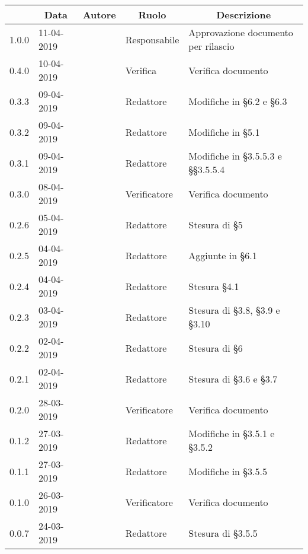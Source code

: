 \pagestyle{styleDocPages}

\begin{center} \sloppy
	\renewcommand{\arraystretch}{2.5}
	
	\begin{longtable}[H]{p{1.7cm} p{2cm} p{1.8cm} p{2.5cm} p{4cm}}
\rowcolor[HTML]{232f3e}
\multicolumn{1}{c}{\color[HTML]{FFFFFF} \textbf{Versione}} & 
\multicolumn{1}{c}{\color[HTML]{FFFFFF} \textbf{Data}} & 
\multicolumn{1}{c}{\color[HTML]{FFFFFF} \textbf{Autore}} & 
\multicolumn{1}{c}{\color[HTML]{FFFFFF} \textbf{Ruolo}} & 
\multicolumn{1}{c}{\color[HTML]{FFFFFF} \textbf{Descrizione}} \\
\endhead

1.0.0 & 11-04-2019 & \daniele{} & Responsabile & Approvazione documento per rilascio\\
0.4.0 & 10-04-2019 & \valentin{} & Verifica & Verifica documento\\
0.3.3 & 09-04-2019 & \francesco{} & Redattore & Modifiche in §6.2 e §6.3\\
0.3.2 & 09-04-2019 & \singh{} & Redattore & Modifiche in §5.1\\
0.3.1 & 09-04-2019 & \andrea{} & Redattore & Modifiche in §3.5.5.3 e §§3.5.5.4\\
0.3.0 & 08-04-2019 & \valentin{} & Verificatore & Verifica documento\\
0.2.6 & 05-04-2019 & \singh{} & Redattore & Stesura di §5\\
0.2.5 & 04-04-2019 & \francesco{} & Redattore & Aggiunte in §6.1\\
0.2.4 & 04-04-2019 & \singh{} & Redattore & Stesura §4.1\\
0.2.3 & 03-04-2019 & \andrea{} & Redattore & Stesura di §3.8, §3.9 e §3.10\\
0.2.2 & 02-04-2019 & \francesco{} & Redattore & Stesura di §6\\
0.2.1 & 02-04-2019 & \andrea{} & Redattore & Stesura di §3.6 e §3.7\\
0.2.0 & 28-03-2019 & \davide{} & Verificatore & Verifica documento\\
0.1.2 & 27-03-2019 & \andrea{} & Redattore & Modifiche in §3.5.1 e §3.5.2\\
0.1.1 & 27-03-2019 & \singh{} & Redattore & Modifiche in §3.5.5\\
0.1.0 & 26-03-2019 & \davide{} & Verificatore & Verifica documento\\
0.0.7 & 24-03-2019 & \singh{} & Redattore & Stesura di §3.5.5\\

\end{longtable}
\end{center}
